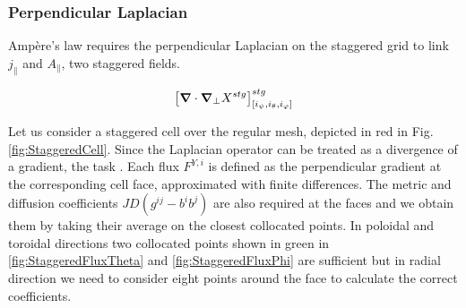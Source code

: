 \subsubsection{Perpendicular Laplacian}

Ampère's law requires the perpendicular Laplacian on the staggered grid to link $j_\parallel$ and $A_\parallel$, two staggered fields.

\begin{equation}
	\left[\grad\cdot\grad_{\perp}X^{stg}\right]^{stg}_{[i_\psi,i_\theta, i_\varphi]}
\end{equation}

Let us consider a staggered cell over the regular mesh, depicted in red in Fig. \ref{fig:StaggeredCell}. Since the Laplacian operator can be treated as a divergence of a gradient, the task . Each flux $F^{Y,i}$ is defined as the perpendicular gradient at the corresponding cell face, approximated with finite differences. The metric and diffusion coefficients $JD(g^{ij}-b^ib^j)$ are also required at the faces and we obtain them by taking their average on the closest collocated points. In poloidal and toroidal directions two collocated points shown in green in \autoref{fig:StaggeredFluxTheta} and \autoref{fig:StaggeredFluxPhi} are sufficient but in radial direction we need to consider eight points around the face to calculate the correct coefficients. \\

